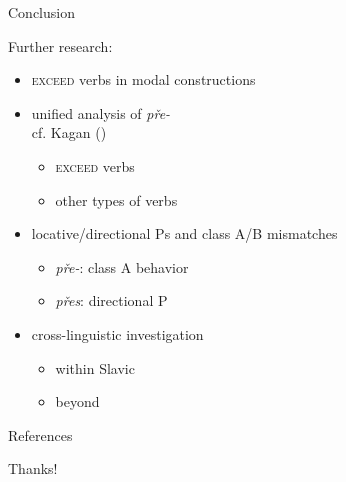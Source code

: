 \documentclass[12pt]{beamer}
\begin{document}
	\begin{frame}{Conclusion}
		
		Further research:
		
		\begin{itemize}
			\item \textsc{exceed} verbs in modal constructions
			\item unified analysis of \textit{pře-}\\
            \scriptsize cf. Kagan (\citeyear{kagan2013scalarity})\normalsize
			\begin{itemize}
				\item \textsc{exceed} verbs
				\item other types of verbs
			\end{itemize}            
            \item locative/directional Ps and class A/B mismatches
			\begin{itemize}
				\item \textit{pře-}: class A behavior
				\item \textit{přes}: directional P
			\end{itemize}
			\item cross-linguistic investigation
			\begin{itemize}
				\item within Slavic
				\item beyond
			\end{itemize}
		\end{itemize}
		
	\end{frame}
	
	\begin{frame}[t,allowframebreaks]{References}
		


\end{frame}

	\begin{frame}
    
		\begin{center}
			{\Huge Thanks!}
		\end{center}
		
	\end{frame}
		
\end{document}
